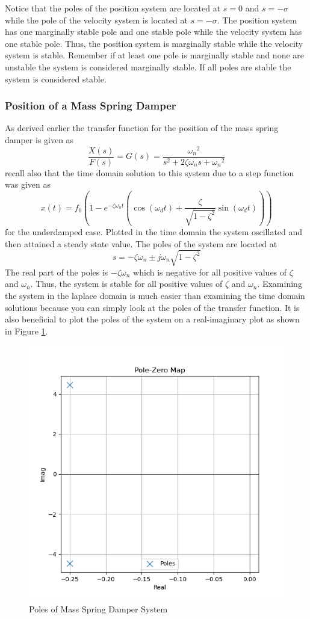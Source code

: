 Notice that the poles of the position system are located at $s=0$ and $s=-\sigma$ while the pole of the velocity system is located at $s=-\sigma$. The position system has one marginally stable pole and one stable pole while the velocity system has one stable pole. Thus, the position system is marginally stable while the velocity system is stable. Remember if at least one pole is marginally stable and none are unstable the system is considered marginally stable. If all poles are stable the system is considered stable.

\subsubsection{Position of a Mass Spring Damper}

As derived earlier the transfer function for the position of the mass spring damper is given as 
\begin{equation}
    \frac{X(s)}{F(s)}= G(s) = \frac{{\omega_n}^2}{s^2 + 2\zeta \omega_n s + {\omega_n}^2}
\end{equation}
recall also that the time domain solution to this system due to a step function was given as 
\begin{equation}
    x(t) = f_0 \left( 1 - e^{-\zeta \omega_n t} \left( \cos(\omega_d t) + \frac{\zeta}{\sqrt{1-\zeta^2}} \sin(\omega_d t) \right) \right)
\end{equation}
for the underdamped case. Plotted in the time domain the system oscillated and then attained a steady state value. The poles of the system are located at 
\begin{equation}
    s = -\zeta \omega_n \pm j \omega_n \sqrt{1-\zeta^2}
\end{equation}
The real part of the poles is $-\zeta \omega_n$ which is negative for all positive values of $\zeta$ and $\omega_n$. Thus, the system is stable for all positive values of $\zeta$ and $\omega_n$. Examining the system in the laplace domain is much easier than examining the time domain solutions because you can simply look at the poles of the transfer function. It is also beneficial to plot the poles of the system on a real-imaginary plot as shown in Figure \ref{f:mass_spring_damper_poles}.
\begin{figure}[H]
\centering
\includegraphics[width=0.6\linewidth]{Figures/mass_spring_damper_poles.png}
\caption{Poles of Mass Spring Damper System}
\label{f:mass_spring_damper_poles}
\end{figure}
